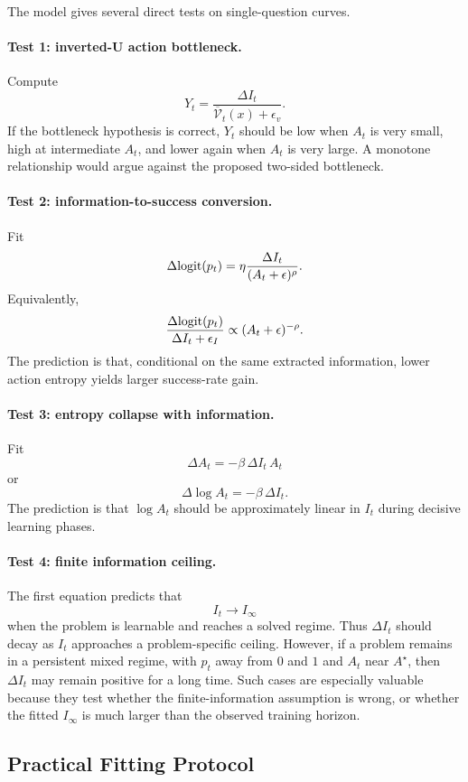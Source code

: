 The model gives several direct tests on single-question curves.

\paragraph{Test 1: inverted-U action bottleneck.}
Compute
\[
  Y_t=\frac{\Delta I_t}{\overline{\mathcal{V}}_t(x)+\epsilon_v}.
\]
If the bottleneck hypothesis is correct, $Y_t$ should be low when $A_t$ is very small, high at intermediate $A_t$, and lower again when $A_t$ is very large. A monotone relationship would argue against the proposed two-sided bottleneck.

\paragraph{Test 2: information-to-success conversion.}
Fit
\[
  \Delta \mathrm{logit}(p_t)
  =
  \eta
  \frac{\Delta I_t}{(A_t+\epsilon)^\rho}.
\]
Equivalently,
\[
  \frac{\Delta \mathrm{logit}(p_t)}{\Delta I_t+\epsilon_I}
  \propto
  (A_t+\epsilon)^{-\rho}.
\]
The prediction is that, conditional on the same extracted information, lower action entropy yields larger success-rate gain.

\paragraph{Test 3: entropy collapse with information.}
Fit
\[
  \Delta A_t
  =
  -\beta\,\Delta I_t\,A_t
\]
or
\[
  \Delta \log A_t
  =
  -\beta\,\Delta I_t.
\]
The prediction is that $\log A_t$ should be approximately linear in $I_t$ during decisive learning phases.

\paragraph{Test 4: finite information ceiling.}
The first equation predicts that
\[
  I_t\to I_\infty
\]
when the problem is learnable and reaches a solved regime. Thus $\Delta I_t$ should decay as $I_t$ approaches a problem-specific ceiling. However, if a problem remains in a persistent mixed regime, with $p_t$ away from $0$ and $1$ and $A_t$ near $A^\star$, then $\Delta I_t$ may remain positive for a long time. Such cases are especially valuable because they test whether the finite-information assumption is wrong, or whether the fitted $I_\infty$ is much larger than the observed training horizon.

\subsection{Practical Fitting Protocol}

